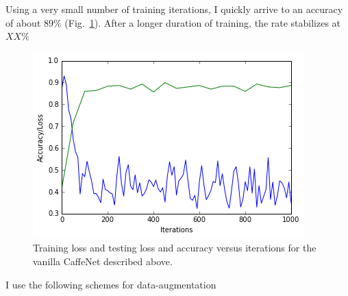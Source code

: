 \documentclass[5pt]{article}
\begin{document}
Using a very small number of training iterations, I quickly arrive to an
accuracy of about $89\%$ (Fig.~\ref{fig:sunset_vanilla_learning}). After a
longer duration of training, the rate stabilizes at $XX\%$

\begin{figure}[h]
  \centering{}
  \includegraphics[width=0.8\columnwidth]{images/sunset_vanilla_learning.png}
  \caption{Training loss and testing loss and accuracy versus iterations for
  the vanilla CaffeNet described above.}
\label{fig:sunset_vanilla_learning}
\end{figure}

I use the following schemes for data-augmentation

\medskip


\end{document}
